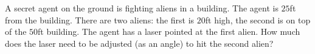 A secret agent on the ground is fighting aliens in a building. The agent is $25$ft from the building. There are two aliens: the first is $20$ft high, the second is on top of the $50$ft building. The agent has a laser pointed at the first alien. How much does the laser need to be adjusted (as an angle) to hit the second alien?
